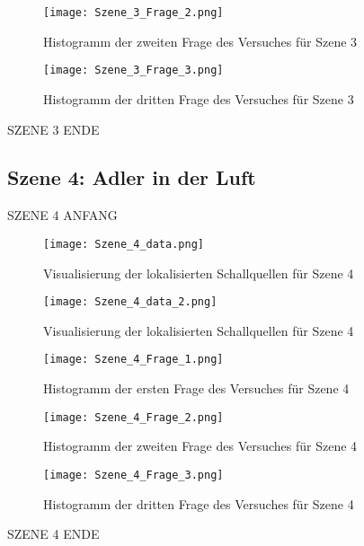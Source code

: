    \begin{figure}[H]
\centering
\texttt{[image: Szene\_3\_Frage\_2.png]}
\caption{Histogramm der zweiten Frage des Versuches für Szene 3}
\label{fig:Szene_1_Frage2}
\end{figure} 

   \begin{figure}[H]
\centering
\texttt{[image: Szene\_3\_Frage\_3.png]}
\caption{Histogramm der dritten Frage des Versuches für Szene 3}
\label{fig:Szene_1_Frage3}
\end{figure} 

SZENE 3 ENDE

 \subsection{Szene 4: Adler in der Luft}
 SZENE 4 ANFANG
   \begin{figure}[H]
\centering
\texttt{[image: Szene\_4\_data.png]}
\caption{Visualisierung der lokalisierten Schallquellen für Szene 4}
\label{fig:Szene_4_data}
\end{figure} 

   \begin{figure}[H]
\centering
\texttt{[image: Szene\_4\_data\_2.png]}
\caption{Visualisierung der lokalisierten Schallquellen für Szene 4}
\label{fig:Szene_4_data_2}
\end{figure} 

   \begin{figure}[H]
\centering
\texttt{[image: Szene\_4\_Frage\_1.png]}
\caption{Histogramm der ersten Frage des Versuches für Szene 4}
\label{fig:Szene_4_Frage1}
\end{figure} 

   \begin{figure}[H]
\centering
\texttt{[image: Szene\_4\_Frage\_2.png]}
\caption{Histogramm der zweiten Frage des Versuches für Szene 4}
\label{fig:Szene_4_Frage2}
\end{figure} 

   \begin{figure}[H]
\centering
\texttt{[image: Szene\_4\_Frage\_3.png]}
\caption{Histogramm der dritten Frage des Versuches für Szene 4}
\label{fig:Szene_4_Frage3}
\end{figure} 

SZENE 4 ENDE

